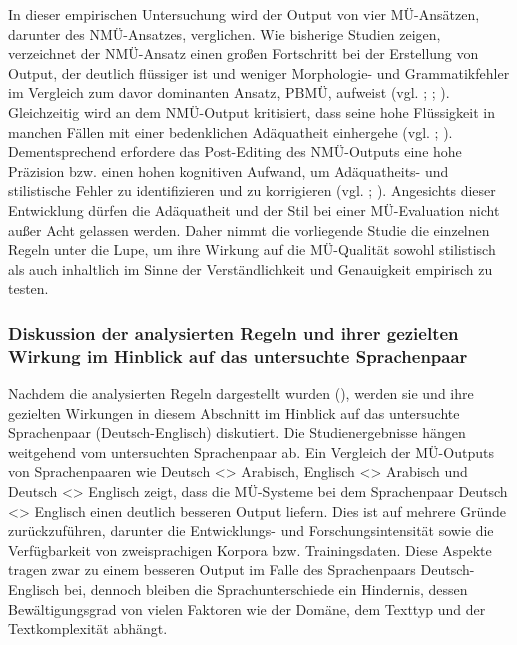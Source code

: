 In dieser empirischen Untersuchung wird der Output von vier MÜ-Ansätzen, darunter des NMÜ-Ansatzes, verglichen. Wie bisherige Studien zeigen, verzeichnet der NMÜ-Ansatz einen großen Fortschritt bei der Erstellung von Output, der deutlich flüssiger ist und weniger Morphologie- und Grammatikfehler im Vergleich zum davor dominanten Ansatz, PBMÜ, aufweist (vgl. \citealt{BentivogliEtAl2016}; \citealt{KlubičkaEtAl2017}; \citealt{ToralSanchez-Cartagena2017}). Gleichzeitig wird an dem NMÜ-Output kritisiert, dass seine hohe Flüssigkeit in manchen Fällen mit einer bedenklichen Adäquatheit einhergehe (vgl. \citealt{CastilhoEtAl2017a}; \citealt{Köhn2017}). Dementsprechend erfordere das Post-Editing des NMÜ-Outputs eine hohe Präzision bzw. einen hohen kognitiven Aufwand, um Adäquatheits- und stilistische Fehler zu identifizieren und zu korrigieren (vgl. \citealt{Volk2018}; \citealt{VardaroEtAl2019}). Angesichts dieser Entwicklung dürfen die Adäquatheit und der Stil bei einer MÜ-Evaluation nicht außer Acht gelassen werden. Daher nimmt die vorliegende Studie die einzelnen Regeln unter die Lupe, um ihre Wirkung auf die MÜ-Qualität sowohl stilistisch als auch inhaltlich im Sinne der Verständlichkeit und Genauigkeit empirisch zu testen.


\subsubsection{\label{sec:4.4.2.3}Diskussion der analysierten Regeln und ihrer gezielten Wirkung im Hinblick auf das untersuchte Sprachenpaar}

Nachdem die analysierten Regeln dargestellt wurden (), werden sie und ihre gezielten Wirkungen in diesem Abschnitt im Hinblick auf das untersuchte Sprachenpaar (Deutsch-Englisch) diskutiert. Die Studienergebnisse hängen weitgehend vom untersuchten Sprachenpaar ab. Ein Vergleich der MÜ-Outputs von Sprachenpaaren wie Deutsch <> Arabisch, Englisch <> Arabisch und Deutsch <> Englisch zeigt, dass die MÜ-Systeme bei dem Sprachenpaar Deutsch <> Englisch einen deutlich besseren Output liefern. Dies ist auf mehrere Gründe zurückzuführen, darunter die Entwicklungs- und Forschungsintensität sowie die Verfügbarkeit von zweisprachigen Korpora bzw. Trainingsdaten. Diese Aspekte tragen zwar zu einem besseren Output im Falle des Sprachenpaars Deutsch-Englisch bei, dennoch bleiben die Sprachunterschiede ein Hindernis, dessen Bewältigungsgrad von vielen Faktoren wie der Domäne, dem Texttyp und der Textkomplexität abhängt.

